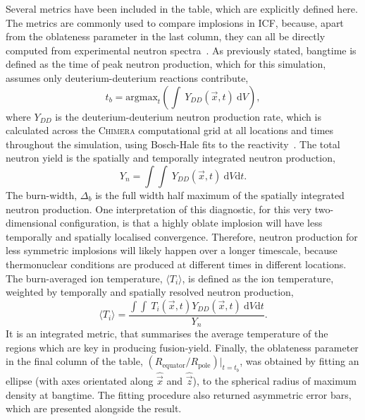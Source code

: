 Several metrics have been included in the table, which are explicitly defined here.
The metrics are commonly used to compare implosions in \ac{ICF}, because, apart from the oblateness parameter in the last column, they can all be directly computed from experimental neutron spectra~\cite{frenje_nuclear_2020}.
As previously stated, bangtime is defined as the time of peak neutron production, which for this simulation, assumes only deuterium-deuterium reactions contribute,
\begin{equation}
    t_b = \text{argmax}_t \left( \int\ Y_{DD}(\vec{x},t)\ \text{d}V \right),
\end{equation}
where $Y_{DD}$ is the deuterium-deuterium neutron production rate, which is calculated across the \textsc{Chimera} computational grid at all locations and times throughout the simulation, using Bosch-Hale fits to the reactivity~\cite{bosch_improved_1992}.
The total neutron yield is the spatially and temporally integrated neutron production,
\begin{equation}
    Y_{n} = \int\int\ Y_{DD}(\vec{x},t)\ \text{d}V\text{d}t.
\end{equation}
The burn-width, $\Delta_b$ is the full width half maximum of the spatially integrated neutron production.
One interpretation of this diagnostic, for this very two-dimensional configuration, is that a highly oblate implosion will have less temporally and spatially localised convergence.
Therefore, neutron production for less symmetric implosions will likely happen over a longer timescale, because thermonuclear conditions are produced at different times in different locations.
The burn-averaged ion temperature, $\langle T_i \rangle$, is defined as the ion temperature, weighted by temporally and spatially resolved neutron production,
\begin{equation}
    \langle T_i \rangle = \frac{\int\int\ T_i(\vec{x},t) Y_{DD}(\vec{x},t)\ \text{d}V\text{d}t}{Y_{n}}.
\end{equation}
It is an integrated metric, that summarises the average temperature of the regions which are key in producing fusion-yield.
Finally, the oblateness parameter in the final column of the table, $(R_{\text{equator}}/R_{\text{pole}})|_{t=t_b}$, was obtained by fitting an ellipse (with axes orientated along $\hat{\vec{x}}$ and $\hat{\vec{z}}$), to the spherical radius of maximum density at bangtime.
The fitting procedure also returned asymmetric error bars, which are presented alongside the result.

